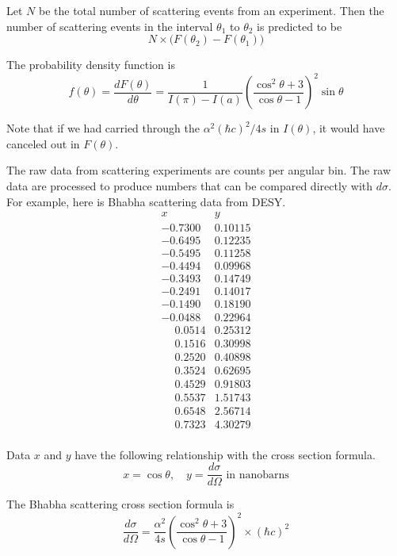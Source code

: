 \documentclass[12pt]{article}
\begin{document}
Let $N$ be the total number of scattering events from an experiment.
Then the number of scattering events in the interval $\theta_1$
to $\theta_2$ is predicted to be
$$
N\times\bigl(F(\theta_2)-F(\theta_1)\bigr)
$$

The probability density function is
$$
f(\theta)=\frac{dF(\theta)}{d\theta}
=\frac{1}{I(\pi)-I(a)}
\left(\frac{\cos^2\theta+3}{\cos\theta-1}\right)^2
\sin\theta
$$

Note that if we had carried through the $\alpha^2(\hbar c)^2/4s$ in $I(\theta)$,
it would have canceled out in $F(\theta)$.

\bigskip

The raw data from scattering experiments are counts per angular bin.
The raw data are processed to produce numbers that can
be compared directly with $d\sigma$.
For example, here is Bhabha scattering data from DESY.
\begin{equation*}
\begin{matrix}
x & y\\
-0.7300 & 0.10115\\
-0.6495 & 0.12235\\
-0.5495 & 0.11258\\
-0.4494 & 0.09968\\
-0.3493 & 0.14749\\
-0.2491 & 0.14017\\
-0.1490 & 0.18190\\
-0.0488 & 0.22964\\
\phantom{+}0.0514 & 0.25312\\
\phantom{+}0.1516 & 0.30998\\
\phantom{+}0.2520 & 0.40898\\
\phantom{+}0.3524 & 0.62695\\
\phantom{+}0.4529 & 0.91803\\
\phantom{+}0.5537 & 1.51743\\
\phantom{+}0.6548 & 2.56714\\
\phantom{+}0.7323 & 4.30279\\
\end{matrix}
\end{equation*}

Data $x$ and $y$ have the following relationship with the cross section formula.
\begin{equation*}
x=\cos\theta,
\quad
y=\frac{d\sigma}{d\Omega}\text{ in nanobarns}
\end{equation*}

The Bhabha scattering cross section formula is
\begin{equation*}
\frac{d\sigma}{d\Omega}
=\frac{\alpha^2}{4s}
\left(\frac{\cos^2\theta+3}{\cos\theta-1}\right)^2\times(\hbar c)^2
\end{equation*}
\end{document}
